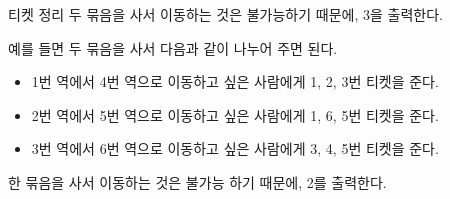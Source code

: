\begin{problem}{티켓 정리}
	두 묶음을 사서 이동하는 것은 불가능하기 때문에, 3을 출력한다.

	\begin{example}
\end{example}

예를 들면 두 묶음을 사서 다음과 같이 나누어 주면 된다.

\begin{itemize}
	\item 1번 역에서 4번 역으로 이동하고 싶은 사람에게 1, 2, 3번 티켓을 준다.
	\item 2번 역에서 5번 역으로 이동하고 싶은 사람에게 1, 6, 5번 티켓을 준다.
	\item 3번 역에서 6번 역으로 이동하고 싶은 사람에게 3, 4, 5번 티켓을 준다.
\end{itemize}

한 묶음을 사서 이동하는 것은 불가능 하기 때문에, 2를 출력한다.

	
\end{problem}


